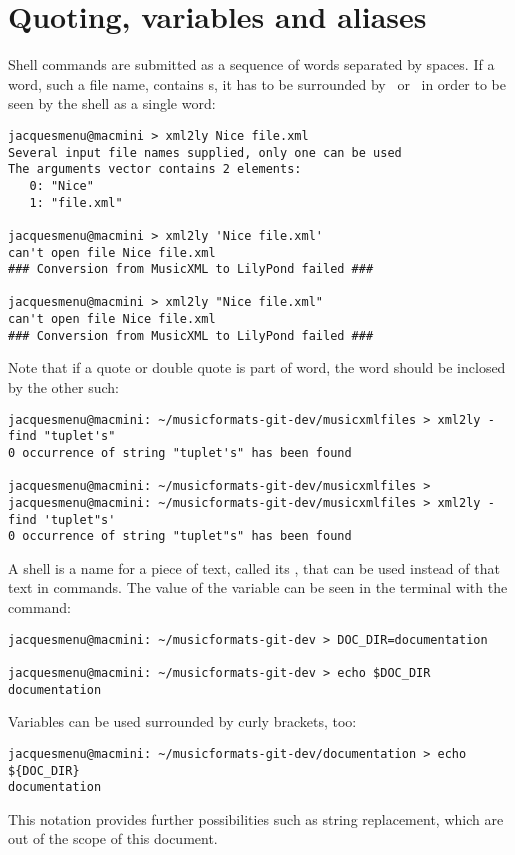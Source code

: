 \section{Quoting, variables and aliases}\label{Quoting, variables and aliases}

Shell commands are submitted as a sequence of words separated by spaces. If a word, such a file name, contains s, it has to be surrounded by \quotes\ or \doubleQuotes\ in order to be seen by the shell as a single word:
\begin{lstlisting}[language=Terminal]
jacquesmenu@macmini > xml2ly Nice file.xml
Several input file names supplied, only one can be used
The arguments vector contains 2 elements:
   0: "Nice"
   1: "file.xml"

jacquesmenu@macmini > xml2ly 'Nice file.xml'
can't open file Nice file.xml
### Conversion from MusicXML to LilyPond failed ###

jacquesmenu@macmini > xml2ly "Nice file.xml"
can't open file Nice file.xml
### Conversion from MusicXML to LilyPond failed ###
\end{lstlisting}

Note that if a quote or double quote is part of word, the word should be inclosed by the other such:
\begin{lstlisting}[language=Terminal]
jacquesmenu@macmini: ~/musicformats-git-dev/musicxmlfiles > xml2ly -find "tuplet's"
0 occurrence of string "tuplet's" has been found

jacquesmenu@macmini: ~/musicformats-git-dev/musicxmlfiles > 
jacquesmenu@macmini: ~/musicformats-git-dev/musicxmlfiles > xml2ly -find 'tuplet"s'
0 occurrence of string "tuplet"s" has been found
\end{lstlisting}

A shell  is a name for a piece of text, called its , that can be used instead of that text in commands. The value of the variable can be seen in the terminal with the  command:
\begin{lstlisting}[language=Terminal]
jacquesmenu@macmini: ~/musicformats-git-dev > DOC_DIR=documentation

jacquesmenu@macmini: ~/musicformats-git-dev > echo $DOC_DIR
documentation
\end{lstlisting}

Variables can be used surrounded by curly brackets, too:
\begin{lstlisting}[language=Terminal]
jacquesmenu@macmini: ~/musicformats-git-dev/documentation > echo ${DOC_DIR}
documentation
\end{lstlisting}
This notation provides further possibilities such as string replacement, which are out of the scope of this document.

